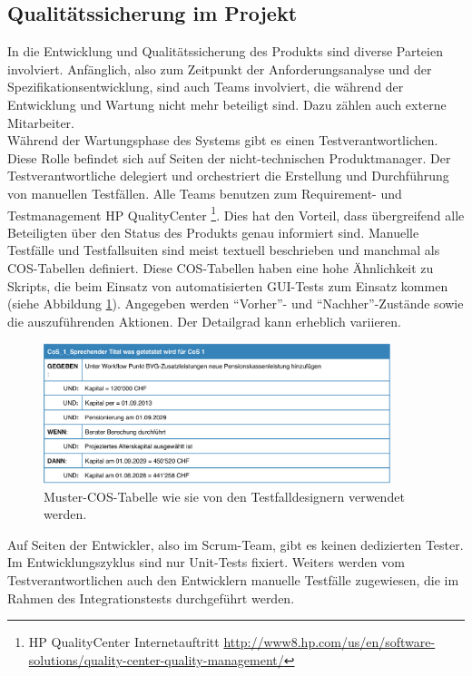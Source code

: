 \subsection{Qualitätssicherung im Projekt}
\label{sec:quality_project}
In die Entwicklung und Qualitätssicherung des Produkts sind diverse Parteien involviert. Anfänglich, also zum Zeitpunkt der Anforderungsanalyse und der Spezifikationsentwicklung, sind auch Teams involviert, die während der Entwicklung und Wartung nicht mehr beteiligt sind. Dazu zählen auch externe Mitarbeiter.\\
Während der Wartungsphase des Systems gibt es einen Testverantwortlichen. Diese Rolle befindet sich auf Seiten der nicht-technischen Produktmanager. Der Testverantwortliche delegiert und orchestriert die Erstellung und Durchführung von manuellen Testfällen. Alle Teams benutzen zum Requirement- und Testmanagement HP QualityCenter \footnote{HP QualityCenter Internetauftritt \url{http://www8.hp.com/us/en/software-solutions/quality-center-quality-management/}}. Dies hat den Vorteil, dass übergreifend alle Beteiligten über den Status des Produkts genau informiert sind. Manuelle Testfälle und Testfallsuiten sind meist textuell beschrieben und manchmal als \gls{COS}-Tabellen definiert. Diese \gls{COS}-Tabellen haben eine hohe Ähnlichkeit zu Skripts, die beim Einsatz von automatisierten GUI-Tests zum Einsatz kommen (siehe Abbildung \ref{fig:cos_raiffeisen}). Angegeben werden ``Vorher''- und ``Nachher''-Zustände sowie die auszuführenden Aktionen. Der Detailgrad kann erheblich variieren.

\begin{figure}[h] 
  \centering
     \includegraphics[width=0.9\textwidth]{figures/cos_raiffeisen.png}
  \caption{Muster-COS-Tabelle wie sie von den Testfalldesignern verwendet werden.}
  \label{fig:cos_raiffeisen}
\end{figure}


Auf Seiten der Entwickler, also im Scrum-Team, gibt es keinen dedizierten Tester. Im Entwicklungszyklus sind nur Unit-Tests fixiert. Weiters werden vom Testverantwortlichen auch den Entwicklern manuelle Testfälle zugewiesen, die im Rahmen des Integrationstests durchgeführt werden.

